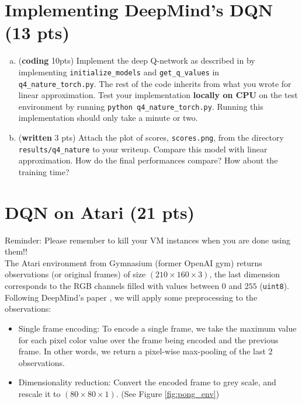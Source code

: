 \documentclass{article}
\newif\ifanswers
\newenvironment{myitemize}
{ \begin{itemize}
    \setlength{\itemsep}{0pt}
    \setlength{\parskip}{0pt}
    \setlength{\parsep}{0pt}     }
  { \end{itemize}                  }
\newcommand{\ifans}[1]{\ifanswers \color{red} \textbf{Solution: } #1 \color{black} \else {} \fi}
\begin{document}
\section{Implementing DeepMind's DQN (13 pts)}

\begin{enumerate}[(a)]

\item (\textbf{coding} 10pts) Implement the deep Q-network as described in \cite{mnih2015human} by implementing \texttt{initialize\_models} and \texttt{get\_q\_values} in \texttt{q4\_nature\_torch.py}. The rest of the code inherits from what you wrote for linear approximation. Test your implementation \textbf{locally on CPU} on the test environment by running \texttt{python q4\_nature\_torch.py}.  Running this implementation should only take a minute or two.

\item (\textbf{written} 3 pts) Attach the plot of scores, \texttt{scores.png}, from the directory \texttt{results/q4\_nature} to your writeup. Compare this model with linear approximation. How do the final performances compare? How about the training time? 

\ifans{
}

\end{enumerate}

\section{DQN on Atari (21 pts)}

Reminder: Please remember to kill your VM instances when you are done using them!! \\

The Atari environment from Gymnasium (former OpenAI gym) returns observations (or original frames) of size $ (210 \times 160 \times 3) $, the last dimension corresponds to the RGB channels filled with values between $ 0 $ and $ 255 $ (\texttt{uint8}). Following DeepMind's paper \cite{mnih2015human}, we will apply some preprocessing to the observations:   
\begin{myitemize}
\item Single frame encoding: To encode a single frame, we take the maximum value for each pixel color value over the frame being encoded and the previous frame. In other words, we return a pixel-wise max-pooling of the last 2 observations.     
\item Dimensionality reduction: Convert the encoded frame to grey scale, and rescale it to $(80 \times 80 \times 1)$. (See Figure \ref{fig:pong_env})     
\end{myitemize}
\end{document}
